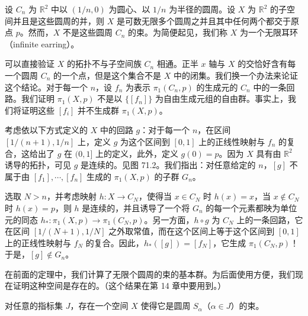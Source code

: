 \documentclass[../../main.tex]{subfiles}
\begin{document}
\begin{example}[无限耳环]\label{example:ch11-infinite-earring}
设 $C_n$ 为 $\mathbb{R}^2$ 中以 $(1/n,0)$ 为圆心、以 $1/n$ 为半径的圆周。设 $X$ 为 $\mathbb{R}^2$ 的子空间并且是这些圆周的并，则 $X$ 是可数无限多个圆周之并且其中任何两个都交于原点 $p$。然而，$X$ 不是这些圆周 $C_n$ 的束。为简便起见，我们称 $X$ 为一个无限耳环（infinite earring）。

可以直接验证 $X$ 的拓扑不与子空间族 $C_n$ 相通。正半 $x$ 轴与 $X$ 的交恰好含有每一个圆周 $C_n$ 的一个点，但是这个集合不是 $X$ 中的闭集。我们换一个办法来论证这个结论。对于每一个 $n$，设 $f_n$ 为表示 $\pi_1(C_n,p)$ 的生成元的 $C_n$ 中的一条回路。我们证明 $\pi_1(X,p)$ 不是以 $\{[f_n]\}$ 为自由生成元组的自由群。事实上，我们将证明这些 $[f_i]$ 并不生成群 $\pi_1(X,p)$。

考虑依以下方式定义的 $X$ 中的回路 $g$：对于每一个 $n$，在区间 $[1/(n+1),1/n]$ 上，定义 $g$ 为这个区间到 $[0,1]$ 上的正线性映射与 $f_n$ 的复合，这给出了 $g$ 在 $(0,1]$ 上的定义，此外，定义 $g(0)=p$。因为 $X$ 具有由 $\mathbb{R}^2$ 诱导的拓扑，可见 $g$ 是连续的。见图 71.2。我们指出：对任意给定的 $n$，$[g]$ 不属于由 $[f_1],\cdots,[f_n]$ 生成的 $\pi_1(X,p)$ 的子群 $G_n$。


选取 $N>n$，并考虑映射 $h:X\to C_N$，使得当 $x\in C_N$ 时 $h(x)=x$，当 $x\notin C_N$ 时 $h(x)=p$，则 $h$ 是连续的，并且诱导了一个将 $G_n$ 的每一个元素都映为单位元的同态 $h_*:\pi_1(X,p)\to\pi_1(C_N,p)$。另一方面，$h\circ g$ 为 $C_N$ 上的一条回路，它在区间 $[1/(N+1),1/N]$ 之外取常值，而在这个区间上等于这个区间到 $[0,1]$ 上的正线性映射与 $f_N$ 的复合。因此，$h_*([g])=[f_N]$，它生成 $\pi_1(C_N,p)$！于是，$[g]\notin G_n$。
\end{example}

在前面的定理中，我们计算了无限个圆周的束的基本群。为后面使用方便，我们现在证明这种空间是存在的。（这个结果在第 14 章中要用到。）

\begin{lemma}\label{lemma:ch11-wedge-existence}
对任意的指标集 $J$，存在一个空间 $X$ 使得它是圆周 $S_\alpha$（$\alpha\in J$）的束。
\end{lemma}
\end{document}
